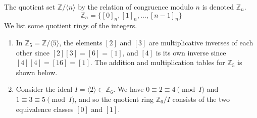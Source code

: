   \begin{example}
    The quotient set $\mathbb{Z}/\langle n \rangle$ by the relation of congruence modulo $n$ is denoted $\mathbb{Z}_{n}$. 
    \begin{equation}
      \mathbb{Z}_{n} = \{ [0]_{n}, [1]_{n}, \ldots, [n-1]_{n} \}
    \end{equation}
    We list some quotient rings of the integers.  
    \begin{enumerate}
      \item In $\mathbb{Z}_{5} = \mathbb{Z}/\langle 5 \rangle$, the elements $[2]$ and $[3]$ are multiplicative inverses of each other since $[2] [3] = [6] = [1]$, and $[4]$ is its own inverse since $[4] [4] = [16] = [1]$. The addition and multiplication tables for $\mathbb{Z}_5$ is shown below. 
      \item Consider the ideal $I = \langle 2 \rangle \subset \mathbb{Z}_6$. We have $0 \equiv 2 \equiv 4 \pmod{I}$ and $1 \equiv 3 \equiv 5 \pmod{I}$, and so the quotient ring $\mathbb{Z}_6 / I$ consists of the two equivalence classes $[0]$ and $[1]$. 
    \end{enumerate}
  \end{example}

